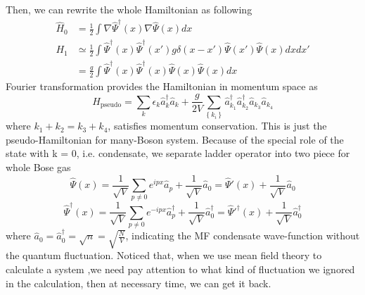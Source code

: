 Then, we can rewrite the whole Hamiltonian as following
\begin{equation}
\begin{split}
\hat{H}_0&=\frac{1}{2}\int \nabla \hat{\Psi }^\dagger(x)\nabla \hat{\Psi }(x)dx\\
H_1&\simeq \frac{1}{2}\int \hat{\Psi }^\dagger(x)\hat{\Psi }^\dagger(x')g \delta (x-x')\hat{\Psi }(x')\hat{\Psi }(x)dxdx'\\
&=\frac{g}{2}\int \hat{\Psi}^\dagger(x)\hat{\Psi }^\dagger(x)\hat{\Psi }(x)\hat{\Psi }(x)dx
\end{split}
\end{equation}
Fourier transformation provides the Hamiltonian in momentum space as
\begin{equation}
\label{Hamil_psuedo}
H_{\text{pseudo}}=\sum_k\epsilon_k\hat{a}_k^\dagger\hat{a}_k+\frac{g}{2V}\sum _{\left\{k_i\right\}}\hat{a}_{k_1}^\dagger\hat{a}_{k_2}^\dagger\hat{a}_{k_3}\hat{a}_{k_4}
\end{equation}
where $k_1+k_2=k_3+k_4$, satisfies momentum conservation. This is just the pseudo-Hamiltonian for many-Boson system.
Because of the special role of the state with k = 0, i.e. condensate, we separate ladder operator into two piece for whole Bose gas
\begin{equation}
\hat{\Psi }(x)=\frac{1}{\sqrt{V}}\sum _{p\neq 0} e^{i p x}\hat{a}_p+\frac{1}{\sqrt{V}}\hat{a}_0=\hat{\Psi }'(x)+\frac{1}{\sqrt{V}}\hat{a}_0
\end{equation}
\begin{equation}
\hat{\Psi }^\dagger(x)=\frac{1}{\sqrt{V}}\sum _{p\neq 0} e^{-i p x}\hat{a}_p^\dagger+\frac{1}{\sqrt{V}}\hat{a}_0^\dagger=\hat{\Psi }'^\dagger(x)+\frac{1}{\sqrt{V}}\hat{a}_0^\dagger
\end{equation}
where $\hat{a}_0=\hat{a}_0^\dagger=\sqrt{n}=\sqrt{\frac{N}{V}}$, indicating the MF condensate wave-function without the quantum fluctuation. Noticed that, when we use mean field theory to calculate a system ,we need pay attention to what kind of  fluctuation we ignored in the calculation, then at necessary time, we can get it back.

